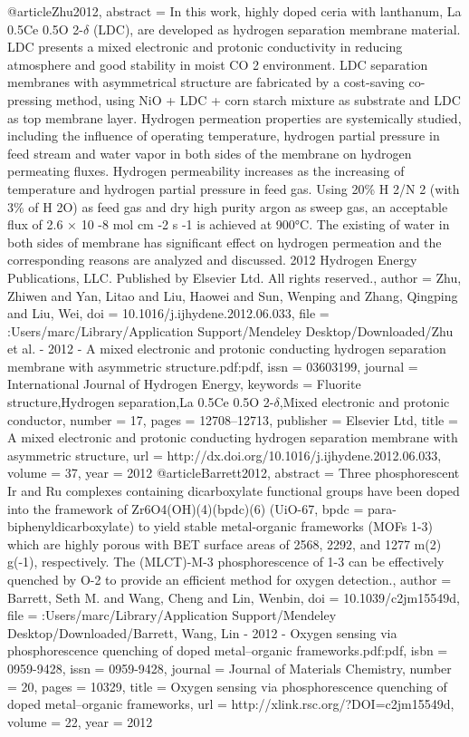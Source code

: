 @article{Zhu2012,
abstract = {In this work, highly doped ceria with lanthanum, La 0.5Ce 0.5O 2-$\delta$ (LDC), are developed as hydrogen separation membrane material. LDC presents a mixed electronic and protonic conductivity in reducing atmosphere and good stability in moist CO 2 environment. LDC separation membranes with asymmetrical structure are fabricated by a cost-saving co-pressing method, using NiO + LDC + corn starch mixture as substrate and LDC as top membrane layer. Hydrogen permeation properties are systemically studied, including the influence of operating temperature, hydrogen partial pressure in feed stream and water vapor in both sides of the membrane on hydrogen permeating fluxes. Hydrogen permeability increases as the increasing of temperature and hydrogen partial pressure in feed gas. Using 20{\%} H 2/N 2 (with 3{\%} of H 2O) as feed gas and dry high purity argon as sweep gas, an acceptable flux of 2.6 × 10 -8 mol cm -2 s -1 is achieved at 900°C. The existing of water in both sides of membrane has significant effect on hydrogen permeation and the corresponding reasons are analyzed and discussed. {\textcopyright} 2012 Hydrogen Energy Publications, LLC. Published by Elsevier Ltd. All rights reserved.},
author = {Zhu, Zhiwen and Yan, Litao and Liu, Haowei and Sun, Wenping and Zhang, Qingping and Liu, Wei},
doi = {10.1016/j.ijhydene.2012.06.033},
file = {:Users/marc/Library/Application Support/Mendeley Desktop/Downloaded/Zhu et al. - 2012 - A mixed electronic and protonic conducting hydrogen separation membrane with asymmetric structure.pdf:pdf},
issn = {03603199},
journal = {International Journal of Hydrogen Energy},
keywords = {Fluorite structure,Hydrogen separation,La 0.5Ce 0.5O 2-$\delta$,Mixed electronic and protonic conductor},
number = {17},
pages = {12708--12713},
publisher = {Elsevier Ltd},
title = {{A mixed electronic and protonic conducting hydrogen separation membrane with asymmetric structure}},
url = {http://dx.doi.org/10.1016/j.ijhydene.2012.06.033},
volume = {37},
year = {2012}
}
@article{Barrett2012,
abstract = {Three phosphorescent Ir and Ru complexes containing dicarboxylate functional groups have been doped into the framework of Zr6O4(OH)(4)(bpdc)(6) (UiO-67, bpdc = para-biphenyldicarboxylate) to yield stable metal-organic frameworks (MOFs 1-3) which are highly porous with BET surface areas of 2568, 2292, and 1277 m(2) g(-1), respectively. The (MLCT)-M-3 phosphorescence of 1-3 can be effectively quenched by O-2 to provide an efficient method for oxygen detection.},
author = {Barrett, Seth M. and Wang, Cheng and Lin, Wenbin},
doi = {10.1039/c2jm15549d},
file = {:Users/marc/Library/Application Support/Mendeley Desktop/Downloaded/Barrett, Wang, Lin - 2012 - Oxygen sensing via phosphorescence quenching of doped metal–organic frameworks.pdf:pdf},
isbn = {0959-9428},
issn = {0959-9428},
journal = {Journal of Materials Chemistry},
number = {20},
pages = {10329},
title = {{Oxygen sensing via phosphorescence quenching of doped metal–organic frameworks}},
url = {http://xlink.rsc.org/?DOI=c2jm15549d},
volume = {22},
year = {2012}
}
